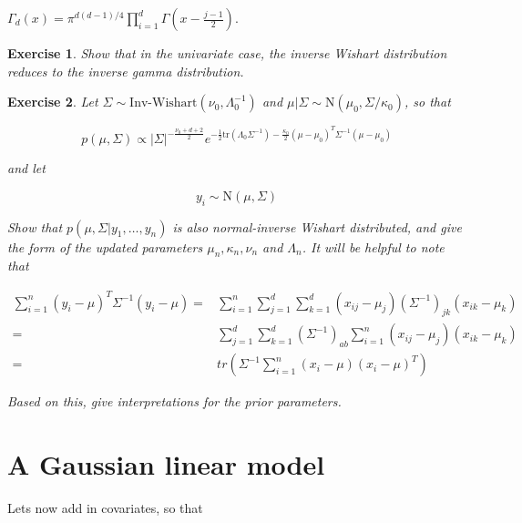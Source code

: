 \documentclass[twoside]{article}
\newcounter{lecnum}
\newtheorem{exercise}{Exercise}[lecnum]
\begin{document}
$\Gamma_d(x) = \pi^{d(d-1)/4}\prod_{i=1}^d\Gamma\left(x-\frac{j-1}{2}\right)$.

\begin{exercise}

  Show that in the univariate case, the inverse Wishart distribution reduces to the inverse gamma distribution.

\end{exercise}



\begin{exercise}

  Let $\Sigma \sim \mbox{Inv-Wishart}(\nu_0, \Lambda_0^{-1})$ and $\mu|\Sigma \sim \mbox{N}(\mu_0, \Sigma/\kappa_0)$, so that



  $$p(\mu,\Sigma) \propto |\Sigma|^{-\frac{\nu_0+d+2}{2}}e^{-\frac{1}{2}\mbox{tr}(\Lambda_0\Sigma^{-1}) - \frac{\kappa_0}{2}(\mu-\mu_0)^T\Sigma^{-1}(\mu-\mu_0)}$$



  and let

  $$y_i \sim \mbox{N}(\mu, \Sigma)$$

  Show that $p(\mu, \Sigma|y_1,\dots,y_n)$ is also normal-inverse Wishart distributed, and give the form of the updated parameters $\mu_n, \kappa_n, \nu_n$ and $\Lambda_n$. It will be helpful to note that



  $$\begin{aligned}\sum_{i=1}^n(y_i-\mu)^T\Sigma^{-1}(y_i-\mu) =& \sum_{i=1}^n\sum_{j=1}^d\sum_{k=1}^d(x_{ij}-\mu_j)(\Sigma^{-1})_{jk}(x_{ik}-\mu_k)\\
    =& \sum_{j=1}^d\sum_{k=1}^d (\Sigma^{-1})_{ab}\sum_{i=1}^n(x_{ij}-\mu_j)(x_{ik}-\mu_k)\\
    =& tr\left(\Sigma^{-1}\sum_{i=1}^n(x_i-\mu)(x_i-\mu)^T\right)\end{aligned}$$

  

  Based on this, give interpretations for the prior parameters.

\end{exercise}

\newpage

\section{A Gaussian linear model}

Lets now add in covariates, so that
\end{document}
